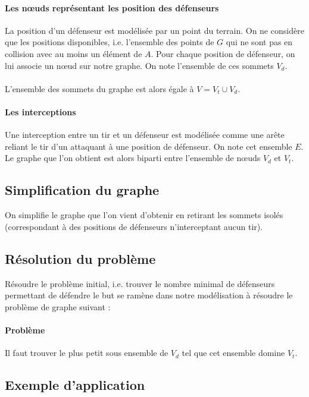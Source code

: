 \documentclass[12pt]{article}
\begin{document}
\paragraph{Les n\oe uds représentant les position des défenseurs}
La position d'un défenseur est modélisée par un point du terrain. On ne considère que les positions disponibles, i.e. l'ensemble des points de $G$ qui ne sont pas en collision avec au moins un élément de $A$. Pour chaque position de défenseur, on lui associe un n\oe ud sur notre graphe. On note l'ensemble de ces sommets $V_d$.

\paragraph{} L'ensemble des sommets du graphe est alors égale à $V = V_t \cup V_d$.

\paragraph{Les interceptions}
Une interception entre un tir et un défenseur est modélisée comme une arête reliant le tir d'un attaquant à une position de défenseur. On note cet ensemble $E$. Le graphe que l'on obtient est alors biparti entre l'ensemble de n\oe uds $V_d$ et $V_t$.

\subsection{Simplification du graphe}
On simplifie le graphe que l'on vient d'obtenir en retirant les sommets isolés (correspondant à des positions de défenseurs n'interceptant aucun tir).

\subsection{Résolution du problème}
Résoudre le problème initial, i.e. trouver le nombre minimal de défenseurs permettant de défendre le but se ramène dans notre modélisation à résoudre le problème de graphe suivant :

\paragraph{Problème} \textcolor{problem}{Il faut trouver le plus petit sous ensemble de $V_d$ tel que cet ensemble domine $V_t$.}

\subsection{Exemple d'application}
\end{document}
